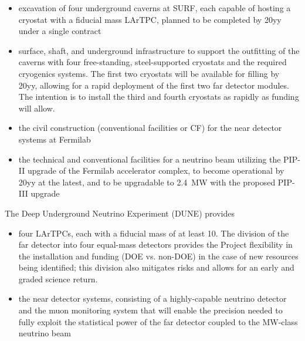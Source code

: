 \begin{itemize}
\item excavation of four underground caverns at SURF, each capable of hosting a cryostat 
with a  fiducial mass LArTPC, %
planned to be completed 
by 20yy %
under a single contract

\item surface, shaft, and underground infrastructure to support 
the outfitting of the caverns with four free-standing, steel-supported cryostats 
and the required cryogenics systems. The first two cryostats will be available for filling by
20yy, %
allowing for a rapid deployment of the first two  far detector modules. 
The intention is to install the third and fourth cryostats as rapidly as funding will 
allow.

\item  the civil construction (conventional facilities or CF) for the near detector systems at Fermilab 

\item  the  technical and conventional facilities for a   neutrino beam utilizing the PIP-II upgrade of the Fermilab accelerator 
complex, to become operational by 20yy %
at the latest, and to be upgradable to \SI{2.4}{\MW} with the proposed 
PIP-III upgrade
\end{itemize}

The Deep Underground Neutrino Experiment (DUNE) provides
\begin{itemize}

\item four  LArTPCs, each with a fiducial mass of at least \SI{10}{\kt}. The division of 
the far detector into four equal-mass detectors provides the Project flexibility 
in the installation and funding (DOE vs. non-DOE) in the case of new resources  being 
identified; this division also mitigates risks and allows for an early and graded science return.

\item the near detector systems, consisting of a highly-capable   neutrino detector 
and the muon monitoring system that will enable %
the precision %
needed to fully 
exploit the statistical power of the %
far detector coupled to the %
MW-class 
neutrino beam
\end{itemize}


